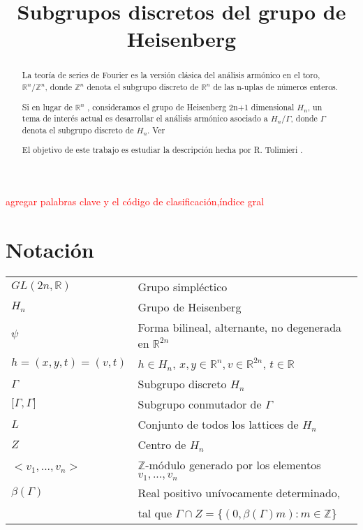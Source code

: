 \documentclass[12pt]{article}
\title{Subgrupos discretos del grupo de Heisenberg }
\date{}
\begin{document}
\maketitle

\begin{abstract}
La teoría de series de Fourier es la versión clásica del análisis armónico en el toro,
$\mathbb{R}^n /\mathbb{Z}^n$, donde $\mathbb{Z}^n$ denota el subgrupo discreto de $\mathbb{R}^n$ de
las n-uplas de números enteros.

Si en lugar de $\mathbb{R}^n$ , consideramos el grupo de Heisenberg 2n+1 dimensional $H_n$, un tema
de interés actual es desarrollar el análisis armónico asociado a $H_n/\Gamma$, donde $\Gamma$ 
denota el subgrupo discreto de $H_n$. Ver \cite{Th} 

El objetivo de este trabajo es estudiar la descripción hecha por R. Tolimieri \cite{To}.

\end{abstract}

\textcolor{red}{agregar palabras clave y el código de clasificación,índice gral}
\section{Notación}
\begin{tabular}{ l l }
  $GL(2n,\mathbb{R})$ & Grupo simpléctico\\
  $H_n$ & Grupo de Heisenberg \\
  $\psi$ & Forma bilineal, alternante, no degenerada  en $\mathbb{R}^{2n}$ \\
  $h=(x,y,t)=(v,t)$ & $h \in H_n$, $x,y \in \mathbb{R}^n,v \in \mathbb{R}^{2n}$, $t \in \mathbb{R}$ \\
  $\Gamma$ & Subgrupo discreto $H_n$ \\
  ${[}\Gamma,\Gamma{]}$ & Subgrupo conmutador de $\Gamma$ \\
  $L$ & Conjunto de todos los lattices de $H_n$ \\
  $Z$ & Centro de $H_n$ \\
  $<v_1,...,v_n>$ & $\mathbb{Z}$-módulo generado por los elementos $v_1,...,v_n$\\
  $\beta(\Gamma)$ & Real positivo unívocamente determinado,\\  
  & tal que $\Gamma \cap Z =\{(0,\beta(\Gamma) m): m\in \mathbb{Z} \}$ \\
\end{tabular}
\end{document}
